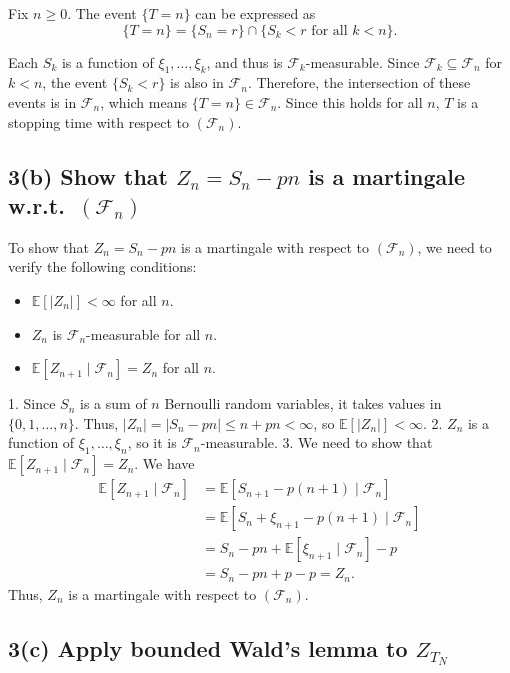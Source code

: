 \documentclass[answers,12pt,addpoints]{exam}
\begin{document}
Fix $n \geq 0$. The event $\{T = n\}$ can be expressed as
$$ \{T = n\} = \{S_{n} = r\} \cap \{S_k < r \text{ for all } k < n\}. $$

Each $S_k$ is a function of $\xi_1, \dots, \xi_k$, and thus is $\mathcal{F}_k$-measurable. Since $\mathcal{F}_k \subseteq \mathcal{F}_n$ for $k < n$, the event $\{S_k < r\}$ is also in $\mathcal{F}_n$. Therefore, the intersection of these events is in $\mathcal{F}_n$, which means $\{T = n\} \in \mathcal{F}_n$. Since this holds for all $n$, $T$ is a stopping time with respect to $(\mathcal{F}_n)$.

\subsection*{3(b) Show that \texorpdfstring{$Z_n = S_n - pn$}{Zn} is a martingale w.r.t.\ \texorpdfstring{$(\mathcal{F}_n)$}{Fn}}

To show that $Z_n = S_n - pn$ is a martingale with respect to $(\mathcal{F}_n)$, we need to verify the following conditions:
\begin{itemize}
    \item $\mathbb{E}[|Z_n|] < \infty$ for all $n$.
    \item $Z_n$ is $\mathcal{F}_n$-measurable for all $n$.
    \item $\mathbb{E}[Z_{n+1} \mid \mathcal{F}_n] = Z_n$ for all $n$.
\end{itemize}
1. Since $S_n$ is a sum of $n$ Bernoulli random variables, it takes values in $\{0, 1, \dots, n\}$. Thus, $|Z_n| = |S_n - pn| \leq n + pn < \infty$, so $\mathbb{E}[|Z_n|] < \infty$.
2. $Z_n$ is a function of $\xi_1, \dots, \xi_n$, so it is $\mathcal{F}_n$-measurable.
3. We need to show that $\mathbb{E}[Z_{n+1} \mid \mathcal{F}_n] = Z_n$. We have
\begin{align*}
\mathbb{E}[Z_{n+1} \mid \mathcal{F}_n] &= \mathbb{E}[S_{n+1} - p(n+1) \mid \mathcal{F}_n] \\
&= \mathbb{E}[S_n + \xi_{n+1} - p(n+1) \mid \mathcal{F}_n] \\
&= S_n - pn + \mathbb{E}[\xi_{n+1} \mid \mathcal{F}_n] - p \\
&= S_n - pn + p - p = Z_n.
\end{align*}
Thus, $Z_n$ is a martingale with respect to $(\mathcal{F}_n)$.

\subsection*{3(c) Apply bounded Wald's lemma to \texorpdfstring{$Z_{T_N}$}{Z\_{T\_N}}}
\end{document}
